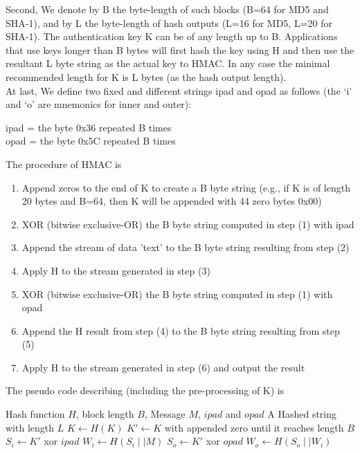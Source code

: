 \documentclass[12pt,a4paper,oneside]{report}
\begin{document}
Second, We denote by B the byte-length of such blocks (B=64 for MD5 and SHA-1), and by L the byte-length of hash outputs (L=16 for MD5, L=20 for SHA-1). The authentication key K can be of any length up to B. Applications that use keys longer than B bytes will first hash the key using H and then use the resultant L byte string as the actual key to HMAC. In any case the minimal recommended length for K is L bytes (as the hash output length).\\

At last, We define two fixed and different strings ipad and opad as follows (the `i' and `o' are mnemonics for inner and outer):
\begin{center}
ipad = the byte 0x36 repeated B times\\
opad = the byte 0x5C repeated B times
\end{center}

The procedure of HMAC is
\begin{enumerate}[(1)]
    \item Append zeros to the end of K to create a B byte string
        (e.g., if K is of length 20 bytes and B=64, then K will be
         appended with 44 zero bytes 0x00)
    \item XOR (bitwise exclusive-OR) the B byte string computed in step
        (1) with ipad
    \item Append the stream of data 'text' to the B byte string resulting
        from step (2)
    \item Apply H to the stream generated in step (3)
    \item XOR (bitwise exclusive-OR) the B byte string computed in
        step (1) with opad
    \item Append the H result from step (4) to the B byte string
        resulting from step (5)
    \item Apply H to the stream generated in step (6) and output
        the result
\end{enumerate}

The pseudo code describing (including the pre-processing of K) is
\begin{algorithm}
    \begin{algorithmic}
        \Require Hash function $H$, block length $B$, Message $M$, $ipad$ and $opad$
        \Ensure A Hashed string with length $L$
                \State $K \gets H(K)$ 
            \EndIf
            \State $K' \gets K$ with appended zero until it reaches length $B$
            \State $S_i \gets K'$ xor $ipad$
            \State $W_i \gets H(S_i \mid\mid M)$
            \State $S_o \gets K'$ xor $opad$
            \State $W_o \gets H(S_o \mid\mid W_i)$
            \State {}
        \EndFunction  
    \end{algorithmic}  
\end{algorithm}
\end{document}
